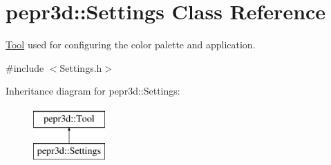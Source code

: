 \hypertarget{classpepr3d_1_1_settings}{}\section{pepr3d\+::Settings Class Reference}
\label{classpepr3d_1_1_settings}


\mbox{\hyperlink{classpepr3d_1_1_tool}{Tool}} used for configuring the color palette and application.  




{\ttfamily \#include $<$Settings.\+h$>$}

Inheritance diagram for pepr3d\+::Settings\+:\begin{figure}[H]
\begin{center}
\leavevmode
\includegraphics[height=2.000000cm]{classpepr3d_1_1_settings}
\end{center}
\end{figure}
